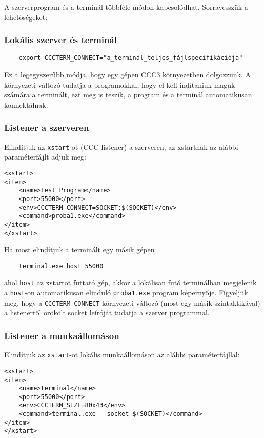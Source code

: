 A szerverprogram és a terminál többféle módon kapcsolódhat.
Sorravesszük a lehetőségeket:

\subsubsection{Lokális szerver és terminál}
\begin{verbatim}
    export CCCTERM_CONNECT="a_terminál_teljes_fájlspecifikációja"
\end{verbatim}
Ez a legegyszerűbb módja, hogy egy gépen CCC3 környezetben 
dolgozzunk. A környezeti változó tudatja a programokkal,
hogy el kell indítaniuk maguk számára a terminált, ezt meg is teszik,
a program és a terminál automatikusan konnektálnak.


\subsubsection{Listener a szerveren}

Elindítjuk az \verb!xstart!-ot (CCC listener) a szerveren,
az xstartnak az alábbi paraméterfájlt adjuk meg:
\begin{verbatim}
<xstart>
<item>
    <name>Test Program</name>
    <port>55000</port>
    <env>CCCTERM_CONNECT=SOCKET:$(SOCKET)</env>
    <command>proba1.exe</command>
</item>
</xstart>
\end{verbatim}
Ha most elindítjuk a terminált egy másik gépen
\begin{verbatim}
    terminal.exe host 55000
\end{verbatim}
ahol \verb!host! az xstartot futtató gép, akkor a lokálisan
futó terminálban megjelenik a \verb!host!-on automatikusan elinduló 
\verb!proba1.exe! program képernyője. Figyeljük meg, 
hogy a \verb!CCCTERM_CONNECT! környezeti változó (most egy másik 
szintaktikával) a listenertől örökölt  socket leíróját tudatja
a szerver programmal.


\subsubsection{Listener a munkaállomáson}
 
Elindítjuk az \verb!xstart!-ot lokális munkaállomáson
az alábbi paraméterfájllal:
\begin{verbatim}
<xstart>
<item>
    <name>terminal</name>
    <port>55000</port>
    <env>CCCTERM_SIZE=80x43</env>
    <command>terminal.exe --socket $(SOCKET)</command>
</item>
</xstart>
\end{verbatim}

